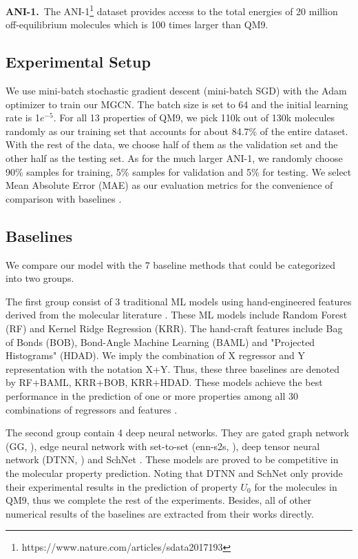\documentclass[letterpaper]{article} \usepackage{bm}
\begin{document}
\noindent \textbf{ANI-1.}\ The ANI-1\footnote{https://www.nature.com/articles/sdata2017193} dataset provides access to the total energies of 20 million off-equilibrium molecules which is 100 times larger than QM9.


\subsection{Experimental Setup}  
 
We use mini-batch stochastic gradient descent (mini-batch SGD) with the Adam optimizer \cite{Kingma2014Adam} to train our MGCN. The batch size is set to 64 and the initial learning rate is 1$e^{-5}$. For all 13 properties of QM9, we pick 110k out of 130k molecules randomly as our training set that accounts for about 84.7\% of the entire dataset. With the rest of the data, we choose half of them as the validation set and the other half as the testing set. As for the much larger ANI-1, we randomly choose 90\% samples for training, 5\% samples for validation and 5\% for testing. We select Mean Absolute Error (MAE) as our evaluation metrics for the convenience of comparison with baselines \cite{faber2017prediction}.

\subsection{Baselines}  

We compare our model with the 7 baseline methods that could be categorized into two groups.   

The first group consist of 3 traditional ML models using hand-engineered features derived from the molecular literature \cite{faber2017prediction,huang2016communication,hansen2015machine}. These ML models include Random Forest (RF) and Kernel Ridge Regression (KRR). The hand-craft features include Bag of Bonds (BOB), Bond-Angle Machine Learning (BAML) and "Projected Histograms" (HDAD). We imply the combination of X regressor and Y representation with the notation X+Y. Thus, these three baselines are denoted by RF+BAML, KRR+BOB, KRR+HDAD. These models achieve the best performance in the prediction of one or more properties among all 30 combinations of regressors and features \cite{faber2017prediction}. 
 
The second group contain 4 deep neural networks. They are gated graph network (GG, \citeauthor{kearnes2016molecular} \citeyear{kearnes2016molecular}), edge neural network with set-to-set (enn-s2s, \citeauthor{Gilmer2017NeuralMP} \citeyear{Gilmer2017NeuralMP}), deep tensor neural network (DTNN, \citeauthor{schutt2017schnet} \citeyear{schutt2017quantum}) and SchNet \cite{schutt2017schnet}. These models are proved to be competitive in the molecular property prediction. Noting that DTNN and SchNet only provide their experimental results in the prediction of property $U_0$ for the molecules in QM9, thus we complete the rest of the experiments. Besides, all of other numerical results of the baselines are extracted from their works directly.
\end{document}
